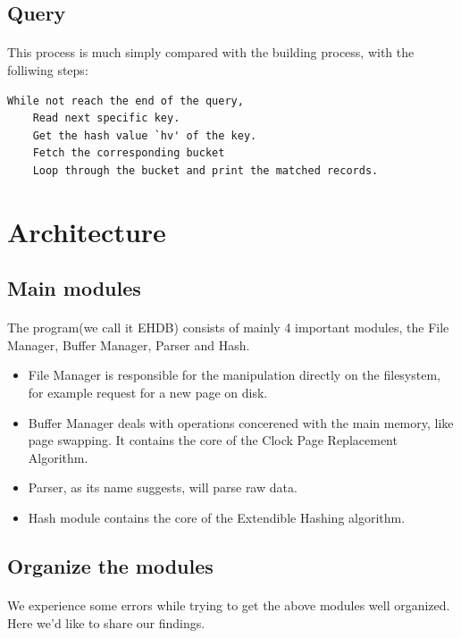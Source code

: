 \documentclass{article}
\begin{document}
    \subsection{Query}
        \paragraph{}
            This process is much simply compared with the building process, with the folliwing steps:
\begin{verbatim}
While not reach the end of the query,
    Read next specific key.
    Get the hash value `hv' of the key.
    Fetch the corresponding bucket
    Loop through the bucket and print the matched records.
\end{verbatim}
\section{Architecture}
    \subsection{Main modules}
        \paragraph{}
            The program(we call it EHDB) consists of mainly 4 important modules, the File Manager, Buffer Manager, Parser and Hash.
        \begin{itemize}
            \item File Manager is responsible for the manipulation directly on the filesystem, for example request for a new page on disk.
            \item Buffer Manager deals with operations concerened with the main memory, like page swapping. It contains the core of the Clock Page Replacement Algorithm.
            \item Parser, as its name suggests, will parse raw data.
            \item Hash module contains the core of the Extendible Hashing algorithm.
        \end{itemize}
    \subsection{Organize the modules}
        \paragraph{}
            We experience some errors while trying to get the above modules well organized. Here we'd like to share our findings.
\end{document}
